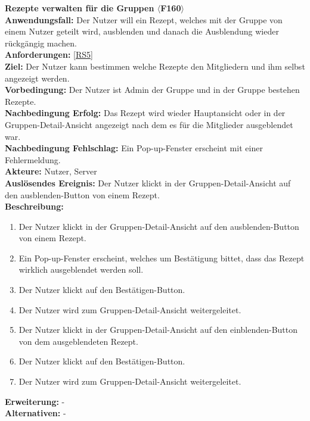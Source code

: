 \documentclass[parskip=full]{scrartcl}
\begin{document}
\textbf{Rezepte verwalten für die Gruppen $\langle$F160$\rangle$}\\
\textbf{Anwendungsfall:} Der Nutzer will ein Rezept, welches mit der Gruppe von einem Nutzer geteilt wird, ausblenden und danach die Ausblendung wieder rückgängig machen.\\
\textbf{Anforderungen:} \ref{RS5}\\
\textbf{Ziel:} Der Nutzer kann bestimmen welche Rezepte den Mitgliedern und ihm selbst angezeigt werden.\\
\textbf{Vorbedingung:} Der Nutzer ist Admin der Gruppe und in der Gruppe bestehen Rezepte.\\
\textbf{Nachbedingung Erfolg:} Das Rezept wird wieder Hauptansicht oder in der Gruppen-Detail-Ansicht angezeigt nach dem es für die Mitglieder  ausgeblendet war.\\
\textbf{Nachbedingung Fehlschlag:} Ein Pop-up-Fenster erscheint mit einer Fehlermeldung.\\
\textbf{Akteure:} Nutzer, Server \\
\textbf{Auslösendes Ereignis:} Der Nutzer klickt in der Gruppen-Detail-Ansicht auf den ausblenden-Button von einem Rezept.\\
\textbf{Beschreibung:}
\begin{enumerate}
    \item Der Nutzer klickt in der Gruppen-Detail-Ansicht auf den ausblenden-Button von einem Rezept.
    \item Ein Pop-up-Fenster erscheint, welches um Bestätigung bittet, dass das Rezept wirklich ausgeblendet werden soll.
    \item Der Nutzer klickt auf den Bestätigen-Button.
    \item Der Nutzer wird zum Gruppen-Detail-Ansicht weitergeleitet.
    \item Der Nutzer klickt in der Gruppen-Detail-Ansicht auf den einblenden-Button von dem ausgeblendeten Rezept.
    \item Der Nutzer klickt auf den Bestätigen-Button.
    \item Der Nutzer wird zum Gruppen-Detail-Ansicht weitergeleitet.
\end{enumerate}
\textbf{Erweiterung:} -\\
\textbf{Alternativen:} -\\
\newpage
\end{document}
